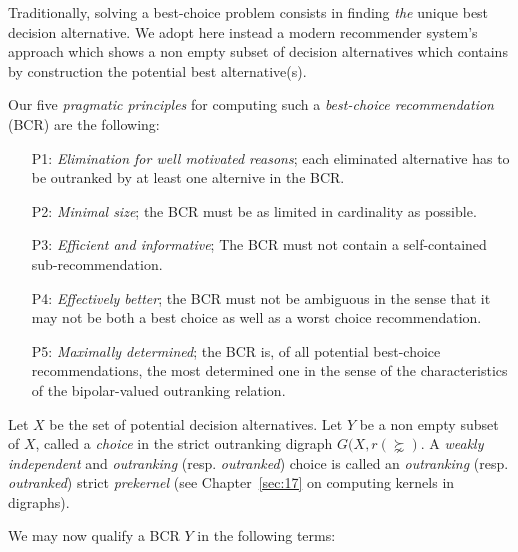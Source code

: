 Traditionally, solving a best-choice problem consists in finding \emph{the} unique best decision alternative. We adopt here instead a modern recommender system’s approach which shows a non empty subset of decision alternatives which contains by construction the potential best alternative(s).

Our five \emph{pragmatic principles} for computing such a \emph{best-choice recommendation} (BCR) are the following:
\begin{itemize}[leftmargin=1cm,listparindent=0em]
\item [P1:] \emph{Elimination for well motivated reasons}; each eliminated alternative has to be outranked by at least one alternive in the BCR.
\item [P2:] \emph{Minimal size}; the BCR must be as limited in cardinality as possible.
\item [P3:] \emph{Efficient and informative}; The BCR must not contain a self-contained sub-recommendation.
\item [P4:] \emph{Effectively better}; the BCR must not be ambiguous in the sense that it may not be both a best choice as well as a worst choice recommendation.
\item [P5:] \emph{Maximally determined}; the BCR is, of all potential best-choice recommendations, the most determined one in the sense of the characteristics of the bipolar-valued outranking relation.
\end{itemize}

Let $X$ be the set of potential decision alternatives. Let $Y$ be a non empty subset of $X$, called a \emph{choice} in the strict outranking digraph $G(X,r(\succnsim )$. A \emph{weakly independent} and \emph{outranking} (resp. \emph{outranked}) choice is called an \emph{outranking} (resp. \emph{outranked}) strict \emph{prekernel} (see Chapter~\ref{sec:17} on computing kernels in digraphs).

We may now qualify a BCR $Y$ in the following terms:

